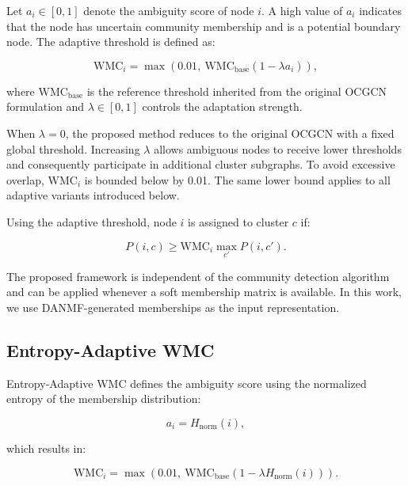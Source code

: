 \documentclass[pdflatex,sn-mathphys-num]{sn-jnl}%
\theoremstyle{thmstyleone}%
\theoremstyle{thmstyletwo}%
\theoremstyle{thmstylethree}%
\begin{document}
Let $a_i \in [0,1]$ denote the ambiguity score of node $i$.
A high value of $a_i$ indicates that the node has uncertain community membership and is a potential boundary node.
The adaptive threshold is defined as:

\begin{equation}
  \mathrm{WMC}_i =
  \max\left(0.01,\ \mathrm{WMC}_{\mathrm{base}}
  \left(1-\lambda a_i\right)\right),
  \label{eq:adaptive}
\end{equation}

where $\mathrm{WMC}_{\mathrm{base}}$ is the reference threshold inherited from the original OCGCN formulation and $\lambda\in[0,1]$ controls the adaptation strength.

When $\lambda=0$, the proposed method reduces to the original OCGCN with a fixed global threshold.
Increasing $\lambda$ allows ambiguous nodes to receive lower thresholds and consequently participate in additional cluster subgraphs.
To avoid excessive overlap, $\mathrm{WMC}_i$ is bounded below by 0.01.
The same lower bound applies to all adaptive variants introduced below.

Using the adaptive threshold, node $i$ is assigned to cluster $c$ if:

\begin{equation}
P(i,c)\geq
\mathrm{WMC}_i
\max_{c'}P(i,c').
\label{eq:selection-rule}
\end{equation}

The proposed framework is independent of the community detection algorithm and can be applied whenever a soft membership matrix is available.
In this work, we use DANMF-generated memberships as the input representation.

\subsection{Entropy-Adaptive WMC}
\label{subsec:entropy-adaptive}

Entropy-Adaptive WMC defines the ambiguity score using the normalized entropy of the membership distribution:

\begin{equation}
a_i = H_{\mathrm{norm}}(i),
\label{eq:entropy-score}
\end{equation}

which results in:

\begin{equation}
\mathrm{WMC}_i =
\max\left(0.01,\ \mathrm{WMC}_{\mathrm{base}}
(1-\lambda H_{\mathrm{norm}}(i))\right).
\label{eq:entropy-adaptive}
\end{equation}
\end{document}
